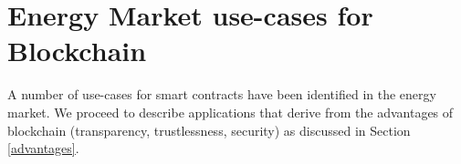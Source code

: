 
 
\section{Energy Market use-cases for Blockchain}

A number of use-cases for smart contracts have been identified in the energy market. We proceed to describe applications that derive from the advantages of blockchain (transparency, trustlessness, security) as discussed in Section \ref{advantages}.

